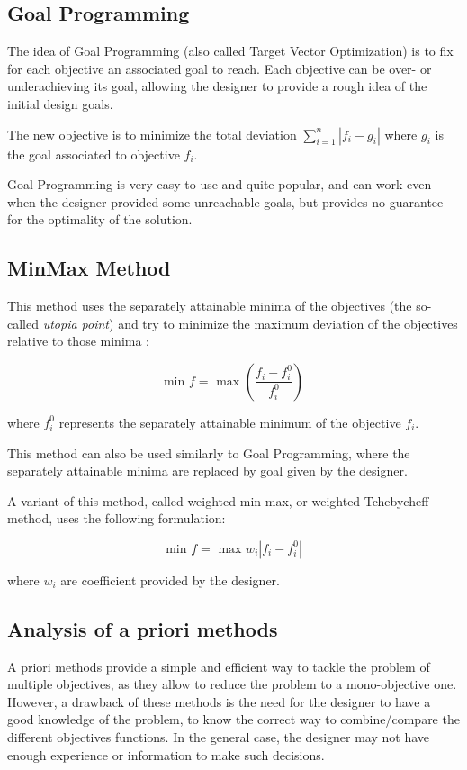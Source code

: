 \subsection{Goal Programming}

The idea of Goal Programming (also called Target Vector Optimization) \cite{charnes1957management} is to fix for each objective an associated goal to reach. Each objective can be over- or underachieving its goal, allowing the designer to provide a rough idea of the initial design goals.

The new objective is to minimize the total deviation $\displaystyle\sum_{i=1}^n |f_i - g_i|$ where $g_i$ is the goal associated to objective $f_i$.

Goal Programming is very easy to use and quite popular, and can work even when the designer provided some unreachable goals, but provides no guarantee for the optimality of the solution.

\subsection{MinMax Method}

This method uses the separately attainable minima of the objectives (the so-called \emph{utopia point}) and try to minimize the maximum deviation of the objectives relative to those minima \cite{osyczka1984multicriterion}:

\[ \text{min } f = \text{ max } \left( \frac{f_i - f_i^0}{f_i^0} \right) \]

where $f_i^0$ represents the separately attainable minimum of the objective $f_i$.

This method can also be used similarly to Goal Programming, where the separately attainable minima are replaced by goal given by the designer.

A variant of this method, called weighted min-max, or weighted Tchebycheff method, uses the following formulation:

\[ \text{min } f = \text{ max } w_i |f_i - f_i^0| \]

where $w_i$ are coefficient provided by the designer.

\subsection{Analysis of a priori methods}

A priori methods provide a simple and efficient way to tackle the problem of multiple objectives, as they allow to reduce the problem to a mono-objective one.
However, a drawback of these methods is the need for the designer to have a good knowledge of the problem, to know the correct way to combine/compare the different objectives functions. In the general case, the designer may not have enough experience or information to make such decisions.

